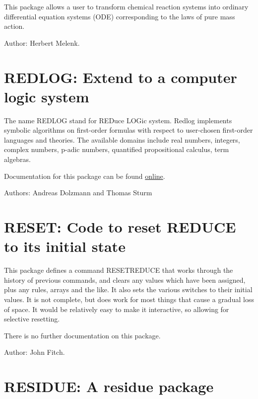 
This package allows a user to transform chemical reaction systems into
ordinary differential equation systems (ODE) corresponding to the laws of
pure mass action.


Author: Herbert Melenk.



\newpage

\section{REDLOG: Extend \REDUCE{} to a computer logic system}


The name REDLOG stand for REDuce LOGic system. Redlog implements
symbolic algorithms on first-order formulas with respect to
user-chosen first-order languages and theories. The available domains
include real numbers, integers, complex numbers, p-adic numbers,
quantified propositional calculus, term algebras.

Documentation for this package can be found \href{http://redlog.eu/}{online}.

Authors: Andreas Dolzmann and Thomas Sturm

\section{RESET: Code to reset REDUCE to its initial state} 

This package defines a command RESETREDUCE that works through the
history of previous commands, and clears any values which have been
assigned, plus any rules, arrays and the like.  It also sets the various
switches to their initial values.  It is not complete, but does work for
most things that cause a gradual loss of space.  It would be relatively
easy to make it interactive, so allowing for selective resetting.

There is no further documentation on this package.

Author: John Fitch.

\newpage

\section{RESIDUE: A residue package} 

